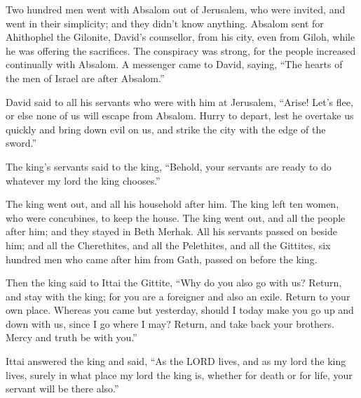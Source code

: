  Two hundred men went with Absalom out of Jerusalem, who
were invited, and went in their simplicity; and they didn't know
anything.  Absalom sent for Ahithophel the Gilonite,
David's counsellor, from his city, even from Giloh, while he was
offering the sacrifices. The conspiracy was strong, for the people
increased continually with Absalom.  A messenger came to
David, saying, ``The hearts of the men of Israel are after Absalom.''

 David said to all his servants who were with him at
Jerusalem, ``Arise! Let's flee, or else none of us will escape from
Absalom. Hurry to depart, lest he overtake us quickly and bring down
evil on us, and strike the city with the edge of the sword.''

 The king's servants said to the king, ``Behold, your
servants are ready to do whatever my lord the king chooses.''

 The king went out, and all his household after him. The
king left ten women, who were concubines, to keep the house.
 The king went out, and all the people after him; and they
stayed in Beth Merhak.  All his servants passed on beside
him; and all the Cherethites, and all the Pelethites, and all the
Gittites, six hundred men who came after him from Gath, passed on before
the king.

 Then the king said to Ittai the Gittite, ``Why do you also
go with us? Return, and stay with the king; for you are a foreigner and
also an exile. Return to your own place.  Whereas you came
but yesterday, should I today make you go up and down with us, since I
go where I may? Return, and take back your brothers. Mercy and truth be
with you.''

 Ittai answered the king and said, ``As the LORD lives, and
as my lord the king lives, surely in what place my lord the king is,
whether for death or for life, your servant will be there also.''

